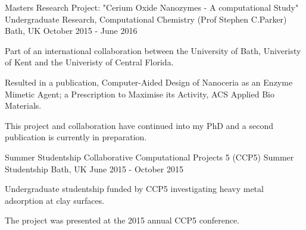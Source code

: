 \begin{cventries}
    \cventry
      {Masters Research Project: "Cerium Oxide Nanozymes - A computational Study"}
      {Undergraduate Research, Computational Chemistry (Prof Stephen C.Parker)}
      {Bath, UK}
      {October 2015 - June 2016}
      {
        \begin{cvitems}
          \item{Part of an international collaboration between the University of Bath, Univeristy of Kent and the Univeristy of Central Florida.} 
          \item {Resulted in a publication, Computer-Aided Design of Nanoceria as an Enzyme Mimetic Agent; a Prescription to Maximise its Activity, ACS Applied Bio Materials. }
          \item {This project and collaboration have continued into my PhD and a second publication is currently in preparation.}
        \end{cvitems} 
      }
      
    \cventry
      {Summer Studentship}
      {Collaborative Computational Projects 5 (CCP5) Summer Studentship}
      {Bath, UK}
      {June 2015 - October 2015}
      {
        \begin{cvitems}
          \item {Undergraduate studentship funded by CCP5 investigating heavy metal adsorption at clay surfaces.}
          \item {The project was presented at the 2015 annual CCP5 conference.}
        \end{cvitems}
      }
\end{cventries}
